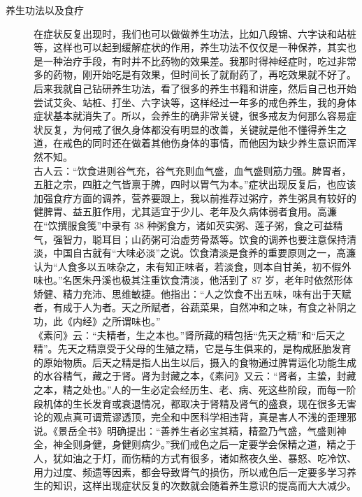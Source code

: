 \documentclass[fontset=founder]{ctexart}
\begin{document}
\begin{description}
    \item[养生功法以及食疗] 在症状反复出现时，我们也可以做做养生功法，比如八段锦、六字诀和站桩等，这样也可以起到缓解症状的作用，养生功法不仅仅是一种保养，其实也是一种治疗手段，有时并不比药物的效果差。我那时得神经症时，吃过非常多的药物，刚开始吃是有效果，但时间长了就耐药了，再吃效果就不好了。后来我就自己钻研养生功法，看了很多的养生书籍和讲座，然后自己也开始尝试艾灸、站桩、打坐、六字诀等，这样经过一年多的戒色养生，我的身体症状基本就消失了。所以，会养生的确非常关键，很多戒友为何那么容易症状反复，为何戒了很久身体都没有明显的改善，关键就是他不懂得养生之道，在戒色的同时还在做着其他伤身体的事情，而他因为缺少养生意识而浑然不知。\\ 古人云：“饮食进则谷气充，谷气充则血气盛，血气盛则筋力强。脾胃者，五脏之宗，四脏之气皆禀于脾，四时以胃气为本。”症状出现反复后，也应该加强食疗方面的调养，营养要跟上，我以前推荐过粥疗，养生粥具有较好的健脾胃、益五脏作用，尤其适宜于少儿、老年及久病体弱者食用。高濂在“饮撰服食笺”中录有 38 种粥食方，诸如芡实粥、莲子粥，食之可益精气，强智力，聪耳目；山药粥可治虚劳骨蒸等。饮食的调养也要注意保持清淡，中国自古就有“大味必淡”之说。饮食清淡是食养的重要原则之一，高濂认为“人食多以五味杂之，未有知正味者，若淡食，则本自甘美，初不假外味也。”名医朱丹溪也极其注重饮食清淡，他活到了 87 岁，老年时依然形体矫健、精力充沛、思维敏捷。他指出：“人之饮食不出五味，味有出于天赋者，有成于人为者。天之所赋者，谷蔬菜果，自然冲和之味，有食之补阴之功，此《内经》之所谓味也。”\\ 《素问》云：“夫精者，生之本也。”肾所藏的精包括“先天之精”和“后天之精”。先天之精禀受于父母的生殖之精，它是与生俱来的，是构成胚胎发育的原始物质。后天之精是指人出生以后，摄入的食物通过脾胃运化功能生成的水谷精气，藏之于肾。肾为封藏之本，《素问》又云：“肾者，主蛰，封藏之本，精之处也。”人的一生必定会经历生、老、病、死这些阶段，而每一阶段机体的生长发育或衰退情况，都取决于肾精及肾气的盛衰，现在很多无害论的观点真可谓荒谬透顶，完全和中医科学相违背，真是害人不浅的歪理邪说。《景岳全书》明确提出：“善养生者必宝其精，精盈乃气盛，气盛则神全，神全则身健，身健则病少。”我们戒色之后一定要学会保精之道，精之于人，犹如油之于灯，而伤精的方式有很多，诸如熬夜久坐、暴怒、吃冷饮、用力过度、频遗等因素，都会导致肾气的损伤，所以戒色后一定要多学习养生的知识，这样出现症状反复的次数就会随着养生意识的提高而大大减少。

\end{description}
\end{document}
